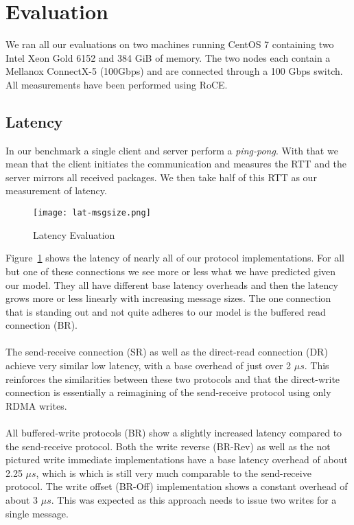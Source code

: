 \section{Evaluation}

We ran all our evaluations on two machines running CentOS 7 containing two Intel Xeon Gold 6152 and 384 GiB of memory.
The two nodes each contain a Mellanox ConnectX-5 (100Gbps) and are connected through a 100 Gbps switch. All measurements
have been performed using RoCE.

\subsection{Latency}

 In our benchmark a single client and server perform a \emph{ping-pong}. With that 
we mean that the client initiates the communication and measures the RTT and the server mirrors all received packages. 
We then take half of this RTT as our measurement of latency.

\begin{figure}[h]
\texttt{[image: lat-msgsize.png]}
\caption{Latency Evaluation}
\label{fig:plot-lat}
\end{figure}


Figure~\ref{fig:plot-lat} shows the latency of nearly all of our protocol implementations. For all but one of these 
connections we see more or less what we have predicted given our model. They all have different base latency overheads
and then the latency grows more or less linearly with increasing message sizes. The one connection that is standing out
and not quite adheres to our model is the buffered read connection (BR).

\paragraph{} The send-receive connection (SR) as well as the direct-read connection (DR) achieve very similar low latency,
with a base overhead of just over 2 $\mu s$. This reinforces the similarities between these two protocols and that the 
direct-write connection is essentially a reimagining of the send-receive protocol using only RDMA writes.



\paragraph{} All buffered-write protocols (BR) show a slightly increased latency compared to the send-receive protocol.
Both the write reverse (BR-Rev) as well as the not pictured write immediate implementations have a base latency overhead 
of about 2.25 $\mu s$, which is which is still very much comparable to the send-receive protocol. The write offset 
(BR-Off) implementation shows a constant overhead of about 3 $\mu s$. This was expected as this approach needs to issue 
two writes for a single message.



